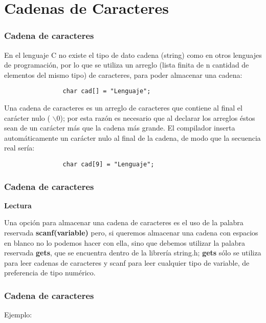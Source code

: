 \section*{Cadenas de Caracteres}

\begin{frame}[t, fragile]
    \frametitle{Cadena de caracteres}
    \justify
    \hspace{5mm}En el lenguaje C no existe el tipo de dato cadena (string) como en otros lenguajes de programación, por lo que se utiliza un arreglo (lista finita de n cantidad de elementos del mismo tipo) de caracteres, para poder almacenar una cadena:
    \begin{lstlisting}
                char cad[] = "Lenguaje";
\end{lstlisting}
    \vspace{-2mm}
    \hspace{5mm}Una cadena de caracteres es un arreglo de caracteres que contiene al final el carácter nulo ( $\backslash$0); por esta razón es necesario que al declarar los arreglos éstos sean de un carácter más que la cadena más grande. El compilador inserta automáticamente un carácter nulo al final de la cadena, de modo que la secuencia real sería:
    \begin{lstlisting}
                char cad[9] = "Lenguaje";
\end{lstlisting}
\end{frame}


\begin{frame}
    \frametitle{Cadena de caracteres}
    \begin{center}\textbf{Lectura}\end{center}
    \justify
    \hspace{5mm}Una opción para almacenar una cadena de caracteres es el uso de la palabra reservada \textbf{scanf(variable)} pero, si queremos almacenar una cadena con espacios en blanco no lo podemos hacer con ella, sino que debemos utilizar la palabra reservada \textbf{gets}, que se encuentra dentro de la librería string.h; \textbf{gets} sólo se utiliza para leer cadenas de caracteres y scanf para leer cualquier tipo de variable, de preferencia de tipo numérico.
\end{frame}

\begin{frame}
    \frametitle{Cadena de caracteres}
    \centering
    Ejemplo:
    
\end{frame}



